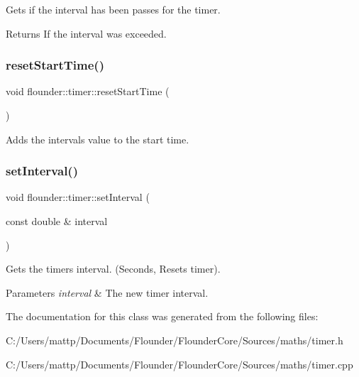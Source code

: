 Gets if the interval has been passes for the timer. 

\begin{DoxyReturn}{Returns}
If the interval was exceeded. 
\end{DoxyReturn}
\mbox{\label{classflounder_1_1timer_af71405c5ec11d085c91aa26d6a8d994c}} 
\subsubsection{\texorpdfstring{reset\+Start\+Time()}{resetStartTime()}}
{\footnotesize\ttfamily void flounder\+::timer\+::reset\+Start\+Time (\begin{DoxyParamCaption}{ }\end{DoxyParamCaption})}



Adds the intervals value to the start time. 

\mbox{\label{classflounder_1_1timer_a801b9883c757b92eaa957f3222c4791d}} 
\subsubsection{\texorpdfstring{set\+Interval()}{setInterval()}}
{\footnotesize\ttfamily void flounder\+::timer\+::set\+Interval (\begin{DoxyParamCaption}\item[{const double \&}]{interval }\end{DoxyParamCaption})}



Gets the timers interval. (Seconds, Resets timer). 


\begin{DoxyParams}{Parameters}
{\em interval} & The new timer interval. \\
\hline
\end{DoxyParams}


The documentation for this class was generated from the following files\+:\begin{DoxyCompactItemize}
\item 
C\+:/\+Users/mattp/\+Documents/\+Flounder/\+Flounder\+Core/\+Sources/maths/timer.\+h\item 
C\+:/\+Users/mattp/\+Documents/\+Flounder/\+Flounder\+Core/\+Sources/maths/timer.\+cpp\end{DoxyCompactItemize}
